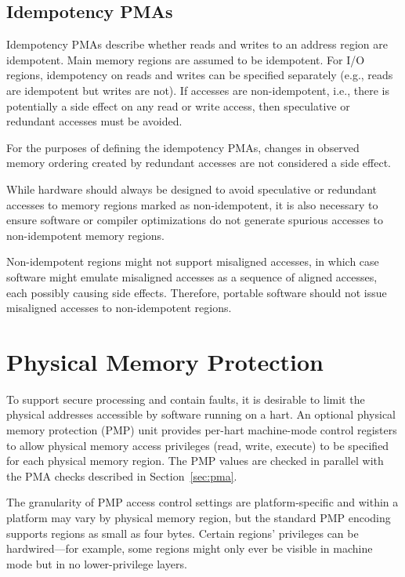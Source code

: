 \subsection{Idempotency PMAs}

Idempotency PMAs describe whether reads and writes to an address
region are idempotent.  Main memory regions are assumed to be
idempotent.  For I/O regions, idempotency on reads and writes can be
specified separately (e.g., reads are idempotent but writes are not).
If accesses are non-idempotent, i.e., there is potentially a side
effect on any read or write access, then speculative or redundant
accesses must be avoided.

For the purposes of defining the idempotency PMAs, changes in observed
memory ordering created by redundant accesses are not considered a
side effect.

\begin{commentary}
While hardware should always be designed to avoid speculative or
redundant accesses to memory regions marked as non-idempotent, it is
also necessary to ensure software or compiler optimizations do not
generate spurious accesses to non-idempotent memory regions.
\end{commentary}

\begin{commentary}
Non-idempotent regions might not support misaligned accesses, in which case
software might emulate misaligned accesses as a sequence of aligned accesses,
each possibly causing side effects.  Therefore, portable software should not
issue misaligned accesses to non-idempotent regions.
\end{commentary}

\section{Physical Memory Protection}
\label{sec:pmp}

To support secure processing and contain faults, it is desirable to
limit the physical addresses accessible by software running on a hart.
An optional physical memory protection (PMP) unit provides
per-hart machine-mode control registers to allow
physical memory access privileges (read, write, execute) to be
specified for each physical memory region.  The PMP values are checked
in parallel with the PMA checks described in Section~\ref{sec:pma}.

The granularity of PMP access control settings are platform-specific and
within a platform may vary by physical memory region, but the standard PMP
encoding supports regions as small as four bytes.  Certain regions' privileges
can be hardwired---for example, some regions might only ever be visible in
machine mode but in no lower-privilege layers.

